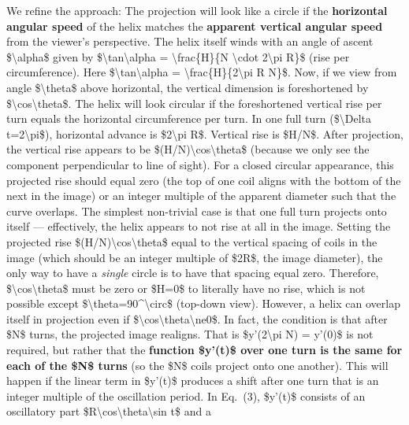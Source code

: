 \documentclass[]{article}
\begin{document}
We refine the approach: The projection will look like a circle if the
\textbf{horizontal angular speed} of the helix matches the
\textbf{apparent vertical angular speed} from the viewer's perspective.
The helix itself winds with an angle of ascent \$\textbackslash{}alpha\$
given by \$\textbackslash{}tan\textbackslash{}alpha =
\textbackslash{}frac\{H\}\{N \textbackslash{}cdot 2\textbackslash{}pi
R\}\$ (rise per circumference). Here
\$\textbackslash{}tan\textbackslash{}alpha =
\textbackslash{}frac\{H\}\{2\textbackslash{}pi R N\}\$. Now, if we view
from angle \$\textbackslash{}theta\$ above horizontal, the vertical
dimension is foreshortened by
\$\textbackslash{}cos\textbackslash{}theta\$. The helix will look
circular if the foreshortened vertical rise per turn equals the
horizontal circumference per turn. In one full turn
(\$\textbackslash{}Delta t=2\textbackslash{}pi\$), horizontal advance is
\$2\textbackslash{}pi R\$. Vertical rise is \$H/N\$. After projection,
the vertical rise appears to be
\$(H/N)\textbackslash{}cos\textbackslash{}theta\$ (because we only see
the component perpendicular to line of sight). For a closed circular
appearance, this projected rise should equal zero (the top of one coil
aligns with the bottom of the next in the image) or an integer multiple
of the apparent diameter such that the curve overlaps. The simplest
non-trivial case is that one full turn projects onto itself ---
effectively, the helix appears to not rise at all in the image. Setting
the projected rise \$(H/N)\textbackslash{}cos\textbackslash{}theta\$
equal to the vertical spacing of coils in the image (which should be an
integer multiple of \$2R\$, the image diameter), the only way to have a
\emph{single} circle is to have that spacing equal zero. Therefore,
\$\textbackslash{}cos\textbackslash{}theta\$ must be zero or \$H=0\$ to
literally have no rise, which is not possible except
\$\textbackslash{}theta=90\^{}\textbackslash{}circ\$ (top-down view).
However, a helix can overlap itself in projection even if
\$\textbackslash{}cos\textbackslash{}theta\textbackslash{}ne0\$. In
fact, the condition is that after \$N\$ turns, the projected image
realigns. That is \$y'(2\textbackslash{}pi N) = y'(0)\$ is not required,
but rather that the \textbf{function \$y'(t)\$ over one turn is the same
for each of the \$N\$ turns} (so the \$N\$ coils project onto one
another). This will happen if the linear term in \$y'(t)\$ produces a
shift after one turn that is an integer multiple of the oscillation
period. In Eq.~(3), \$y'(t)\$ consists of an oscillatory part
\$R\textbackslash{}cos\textbackslash{}theta\textbackslash{}sin t\$ and a
\end{document}

